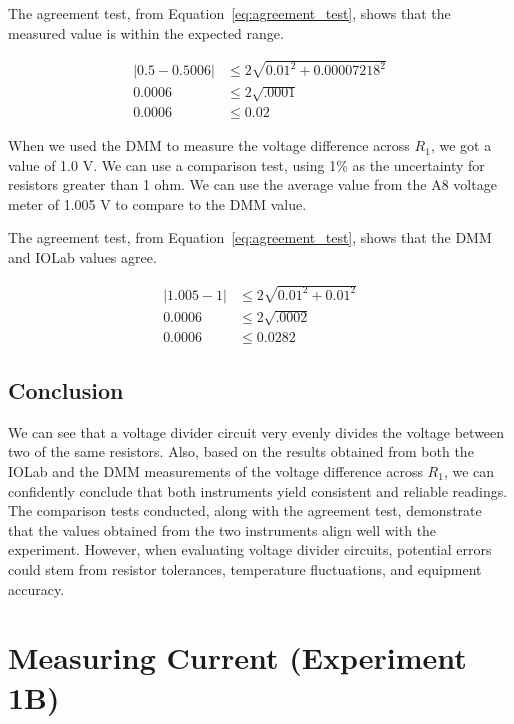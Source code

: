 \documentclass[11pt]{article}
\let\oldsection\section
\renewcommand\section{\clearpage\oldsection}
\begin{document}
    The agreement test, from Equation~\ref{eq:agreement_test}, shows that the measured value is within the expected range.
    \begin{e}
        \begin{align*}
            |0.5 - 0.5006| &\le 2 \sqrt{0.01^2 + 0.00007218^2} \\
            0.0006 &\le 2 \sqrt{.0001} \\
            0.0006 &\le 0.02
        \end{align*}

    When we used the DMM to measure the voltage difference across $R_1$, we got a value of 1.0 V. We can use a comparison test, using 1\% as the uncertainty for resistors greater than 1 ohm. We can use the average value from the A8 voltage meter of 1.005 V to compare to the DMM value.
    
    The agreement test, from Equation~\ref{eq:agreement_test}, shows that the DMM and IOLab values agree.
    \begin{e}
        \begin{align*}
            |1.005 - 1| &\le 2 \sqrt{0.01^2 + 0.01^2} \\
            0.0006 &\le 2 \sqrt{.0002} \\
            0.0006 &\le 0.0282
        \end{align*}
    \end{e}

    \subsection{Conclusion}\label{subsec:voltage_conclusion}

    We can see that a voltage divider circuit very evenly divides the voltage between two of the same resistors. Also, based on the results obtained from both the IOLab and the DMM measurements of the voltage difference across $R_1$, we can confidently conclude that both instruments yield consistent and reliable readings. The comparison tests conducted, along with the agreement test, demonstrate that the values obtained from the two instruments align well with the experiment. However, when evaluating voltage divider circuits, potential errors could stem from resistor tolerances, temperature fluctuations, and equipment accuracy.

    \section{Measuring Current (Experiment 1B)}\label{sec:current}


\end{e}
\end{document}
